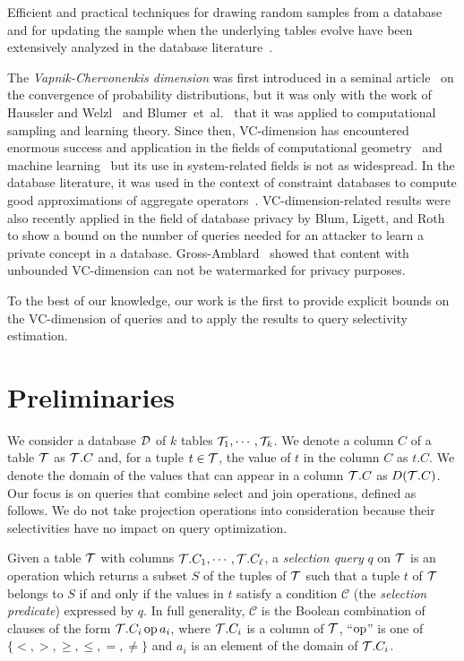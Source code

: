 Efficient and practical techniques for drawing random samples from a database
and for updating  the sample when the underlying tables evolve have been extensively
analyzed in the database
literature~\citep{BrownH06,GemullaLH06,GemullaLH07,HaasK04,JermainePA04}.

The {\em Vapnik-Chervonenkis dimension} was first introduced in a seminal
article~\citep{VapnikC71} on the convergence of probability distributions, but it
was only with the work of Haussler and Welzl~\citeyearpar{HausslerW86} and 
Blumer~et~al.~\citeyearpar{BlumerEHW89} that it was applied to computational sampling
and learning theory. Since then, VC-dimension has encountered
enormous success and application in the fields of computational
geometry~\citep{Chazelle00,Matousek02} and machine learning~\citep{AnthonyB99} but
its use in system-related fields is not as widespread. In the database
literature, it was used in the context of constraint databases to compute good
approximations of aggregate operators~\citep{BenediktL02}. VC-dimension-related
results were also recently applied in the field of database privacy by Blum,
Ligett, and Roth~\citeyearpar{BlumLR08} to show a bound on the number of queries needed
for an attacker to learn a private concept in a database.
Gross-Amblard~\citeyearpar{Gross11} showed that content with unbounded VC-dimension can
not be watermarked for privacy purposes. 

To the best of our knowledge, our work is the first to provide explicit bounds
on the VC-dimension of queries and to apply the results to query selectivity
estimation.

\section{Preliminaries}\label{sec:vcfreqprelims}
We consider a database ${\cal D}$ of $k$ tables ${\cal T}_1,\cdots,{\cal T}_k$. We denote a
column $C$ of a table ${\cal T}$ as ${\cal T}.C$ and, for a tuple $t\in{\cal T}$, the value
of $t$ in the column $C$ as $t.C$. We denote the domain of the values that can
appear in a column ${\cal T}.C$ as $D({\cal T}.C)$. Our focus is on queries that combine
select and join operations, defined as follows. We do not take projection
operations into consideration because their selectivities have no impact on
query optimization.

\begin{definition}\label{def:selectquery}
  Given a table ${\cal T}$ with columns ${\cal T}.C_1,\cdots,{\cal T}.C_\ell$, a
  \emph{selection query} $q$ on ${\cal T}$ is an operation which returns a subset
  $S$ of the tuples of ${\cal T}$ such that a tuple $t$ of ${\cal T}$ belongs to $S$ if
  and only if the values in $t$ satisfy a condition $\mathcal{C}$
  (the \emph{selection predicate}) expressed by $q$. In full
  generality, $\mathcal{C}$ is the Boolean combination of clauses of the form
  ${\cal T}.C_i \operatorname{op} a_i$, where ${\cal T}.C_i$ is a column of ${\cal T}$, ``$\operatorname{op}$'' is one
  of $\{<,>,\ge,\le,=,\neq\}$ and $a_i$ is an element of the domain of
  ${\cal T}.C_i$.
\end{definition}

